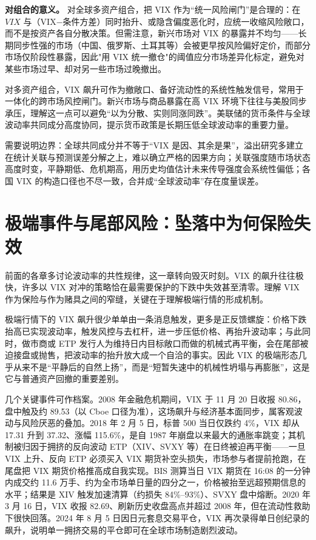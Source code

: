 \documentclass[11pt,a4paper]{ctexart}
\begin{document}
\textbf{对组合的意义。} 对全球多资产组合，把 VIX 作为“统一风险闸门”是合理的：在 $VIX$ 与（VIX−条件方差）同时抬升、或隐含偏度恶化时，应统一收缩风险敞口，而不是按资产各自分散决策。但需注意，新兴市场对 VIX 的暴露并不均匀——长期同步性强的市场（中国、俄罗斯、土耳其等）会被更早按风险偏好定价，而部分市场仅阶段性暴露，因此"用 VIX 统一撤仓"的阈值应分市场差异化标定，避免对某些市场过早、却对另一些市场过晚撤出。

对多资产组合，VIX 飙升可作为撤敞口、备好流动性的系统性触发信号，常用于一体化的跨市场风控闸门。新兴市场与商品暴露在高 VIX 环境下往往与美股同步承压，理解这一点可以避免“以为分散、实则同涨同跌”。美联储的货币条件与全球波动率共同成分高度协同，提示货币政策是长期压低全球波动率的重要力量。

需要说明边界：全球共同成分并不等于“VIX 是因、其余是果”，溢出研究多建立在统计关联与预测误差分解之上，难以确立严格的因果方向；关联强度随市场状态高度时变，平静期低、危机期高，用历史均值估计未来传导强度会系统性偏低；各国 VIX 的构造口径也不尽一致，合并成“全球波动率”存在度量误差。

\section{极端事件与尾部风险：坠落中为何保险失效}

前面的各章多讨论波动率的共性规律，这一章转向毁灭时刻。VIX 的飙升往往极快，许多以 VIX 对冲的策略恰在最需要保护的下跌中失效甚至清零。理解 VIX 作为保险与作为赌具之间的窄缝，关键在于理解极端行情的形成机制。

极端行情下的 VIX 飙升很少单单由一条消息触发，更多是正反馈螺旋：价格下跌抬高已实现波动率，触发风控与去杠杆，进一步压低价格、再抬升波动率；与此同时，做市商或 ETP 发行人为维持日内目标敞口而做的机械式再平衡，会在尾部被迫接盘或抛售，把波动率的抬升放大成一个自洽的事实。因此 VIX 的极端形态几乎从来不是“平静后的自然上扬”，而是“短暂失速中的机械性坍塌与再膨胀”，这是它与普通资产回撤的重要差别。

几个关键事件可作档案。2008 年金融危机期间，VIX 于 11 月 20 日收报 80.86，盘中触及约 89.53（以 Cboe 口径为准），这场飙升与经济基本面同步，属客观波动与风险厌恶的叠加。2018 年 2 月 5 日，标普 500 当日仅跌约 4\%，VIX 却从 17.31 升到 37.32、涨幅 115.6\%，是自 1987 年崩盘以来最大的通胀率跳变；其机制被归因于拥挤的反向波动 ETP（XIV、SVXY 等）在日终被迫再平衡——一旦 VIX 上升、反向 ETP 必须买入 VIX 期货补空头损失，市场参与者提前抢跑，在尾盘把 VIX 期货价格推高成自我实现。BIS 测算当日 VIX 期货在 16:08 的一分钟内成交约 11.6 万手、约为全市场单日量的四分之一，价格被抬至远超预期信息的水平；结果是 XIV 触发加速清算（约损失 84\%–93\%）、SVXY 盘中熔断。2020 年 3 月 16 日，VIX 收报 82.69、刷新历史收盘高点并超过 2008 年，但在流动性救助下很快回落。2024 年 8 月 5 日因日元套息交易平仓，VIX 再次录得单日创纪录的飙升，说明单一拥挤交易的平仓即可在全球市场制造剧烈波动。
\end{document}
